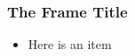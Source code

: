 \begin{frame}[t]
\frametitle{The Frame Title}
\begin{itemize}
    \item Here is an item
\end{itemize}
\end{frame}
